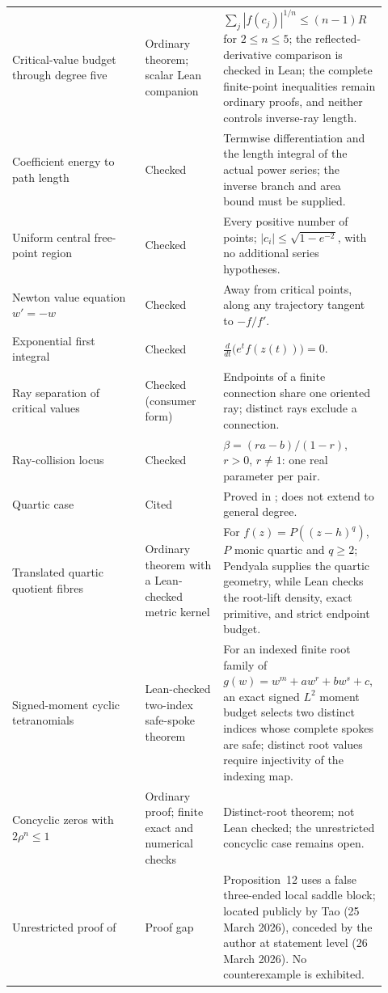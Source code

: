 \documentclass[11pt]{article}
\begin{document}
\begin{longtable}{@{}
  >{\raggedright\arraybackslash}p{0.34\linewidth}
  >{\raggedright\arraybackslash}p{0.20\linewidth}
  >{\raggedright\arraybackslash}p{0.38\linewidth}@{}}
Critical-value budget through degree five & Ordinary theorem; scalar Lean companion & $\sum_j|f(c_j)|^{1/n}\le(n-1)R$ for $2\le n\le5$; the reflected-derivative comparison is checked in Lean; the complete finite-point inequalities remain ordinary proofs, and neither controls inverse-ray length. \\
Coefficient energy to path length & Checked & Termwise differentiation and the length integral of the actual power series; the inverse branch and area bound must be supplied. \\
Uniform central free-point region & Checked & Every positive number of points; $|c_i|\le\sqrt{1-e^{-2}}$, with no additional series hypotheses. \\
Newton value equation $w'=-w$ & Checked & Away from critical points, along any trajectory tangent to $-f/f'$. \\
Exponential first integral & Checked & $\tfrac{d}{dt}\bigl(e^{t}f(z(t))\bigr)=0$. \\
Ray separation of critical values & Checked (consumer form) & Endpoints of a finite connection share one oriented ray; distinct rays exclude a connection. \\
Ray-collision locus & Checked & $\beta=(ra-b)/(1-r)$, $r>0$, $r\ne1$: one real parameter per pair. \\
Quartic case & Cited & Proved in \cite[Thm.~1, p.~1]{june2026}; does not extend to general degree. \\
Translated quartic quotient fibres & Ordinary theorem with a Lean-checked metric kernel & For $f(z)=P((z-h)^q)$, $P$ monic quartic and $q\ge2$; Pendyala supplies the quartic geometry, while Lean checks the root-lift density, exact primitive, and strict endpoint budget. \\
Signed-moment cyclic tetranomials & Lean-checked two-index safe-spoke theorem & For an indexed finite root family of $g(w)=w^m+aw^r+bw^s+c$, an exact signed $L^2$ moment budget selects two distinct indices whose complete spokes are safe; distinct root values require injectivity of the indexing map. \\
Concyclic zeros with $2\rho^n\le1$ & Ordinary proof; finite exact and numerical checks & Distinct-root theorem; not Lean checked; the unrestricted concyclic case remains open. \\
Unrestricted proof of \cite[Theorem~1, p.~1]{march2026} & Proof gap & Proposition~12 uses a false three-ended local saddle block; located publicly by Tao (25 March 2026), conceded by the author at statement level (26 March 2026).  No counterexample is exhibited. \\

\end{longtable}
\end{document}
